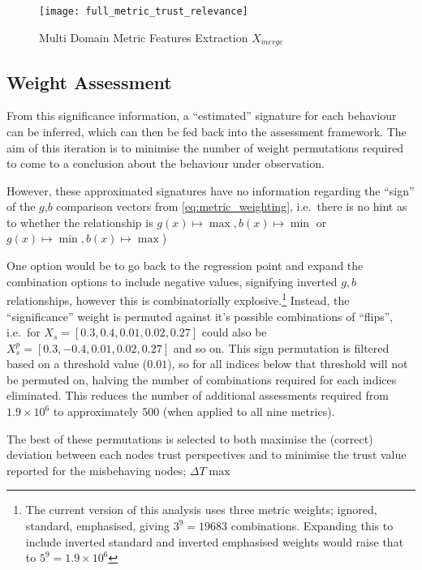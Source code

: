 \begin{figure}[h!]
  \centering
  \texttt{[image: full\_metric\_trust\_relevance]}
  \caption{Multi Domain  Metric Features Extraction $X_{merge}$}
  \label{fig:multi_feature_extraction}
\end{figure}

%

\subsection{Weight Assessment}

From this significance information, a ``estimated'' signature for each behaviour can be inferred, which can then be fed back into the assessment framework. 
The aim of this iteration is to minimise the number of weight permutations required to come to a conclusion about the behaviour under observation. 

However, these approximated signatures have no information regarding the ``sign'' of the  $g$,$b$ comparison vectors from \eqref{eq:metric_weighting}, i.e.\ there is no hint as to whether the relationship is $g(x) \mapsto \max, b(x) \mapsto \min$ or $g(x) \mapsto \min, b(x) \mapsto \max$)  

One option would be to go back to the regression point and expand the combination options to include negative values, signifying inverted $g,b$ relationships, however this is combinatorially explosive.\footnote{The current version of this analysis uses three metric weights; ignored, standard, emphasised, giving $3^9 = 19683$ combinations. Expanding this to include inverted standard and inverted emphasised weights would raise that to $5^9 = 1.9\times 10^6$}
Instead, the ``significance'' weight is permuted against it's possible combinations of ``flips'', i.e.\ for $X_s=[0.3,0.4,0.01,0.02,0.27]$ could also be $X_s^p=[0.3,-0.4,0.01,0.02,0.27]$ and so on. 
This sign permutation is filtered based on a threshold value ($0.01$), so for all indices below that threshold will not be permuted on, halving the number of combinations required for each indices eliminated.
This reduces the number of additional assessments required from $1.9\times 10^6$ to approximately 500 (when applied to all nine metrics).

The best of these permutations is selected to both maximise the (correct) deviation between each nodes trust perspectives and to minimise the trust value reported for the misbehaving nodes; $\Delta T \max$

